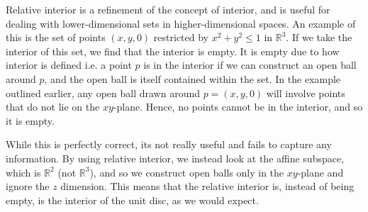 \documentclass[12pt,a4paper]{report}
\begin{document}
Relative interior is a refinement of the concept of interior, and is useful for dealing with lower-dimensional sets in higher-dimensional spaces. An example of this is the set of points $(x, y, 0)$ restricted by $x^2 + y^2 \leq 1$ in $\mathbb{R}^{3}$. If we take the interior of this set, we find that the interior is empty. It is empty due to how interior is defined i.e. a point $p$ is in the interior if we can construct an open ball around $p$, and the open ball is itself contained within the set. In the example outlined earlier, any open ball drawn around $p = (x, y, 0)$ will involve points that do not lie on the $xy$-plane. Hence, no points cannot be in the interior, and so it is empty.

While this is perfectly correct, its not really useful and fails to capture any information. By using relative interior, we instead look at the affine subspace, which is $\mathbb{R}^{2}$ (not $\mathbb{R}^{3}$), and so we construct open balls only in the $xy$-plane and ignore the $z$ dimension. This means that the relative interior is, instead of being empty, is the interior of the unit disc, as we would expect.  


\end{document}
